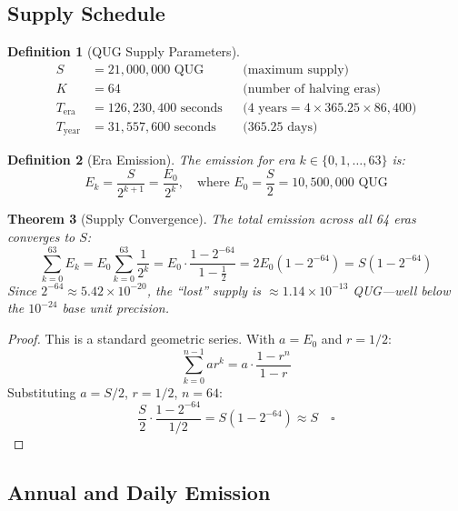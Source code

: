 \documentclass[11pt,a4paper]{article}
\newtheorem{theorem}{Theorem}[section]
\newtheorem{definition}[theorem]{Definition}
\begin{document}
\subsection{Supply Schedule}

\begin{definition}[QUG Supply Parameters]
\label{def:params}
\begin{align}
    S &= 21{,}000{,}000 \text{ QUG} && \text{(maximum supply)} \\
    K &= 64 && \text{(number of halving eras)} \\
    T_{\text{era}} &= 126{,}230{,}400 \text{ seconds} && \text{(4 years} = 4 \times 365.25 \times 86{,}400\text{)} \\
    T_{\text{year}} &= 31{,}557{,}600 \text{ seconds} && \text{(365.25 days)}
\end{align}
\end{definition}

\begin{definition}[Era Emission]
The emission for era $k \in \{0, 1, \ldots, 63\}$ is:
\begin{equation}
    E_k = \frac{S}{2^{k+1}} = \frac{E_0}{2^k}, \quad \text{where } E_0 = \frac{S}{2} = 10{,}500{,}000 \text{ QUG}
\end{equation}
\end{definition}

\begin{theorem}[Supply Convergence]
\label{thm:supply}
The total emission across all 64 eras converges to $S$:
\begin{equation}
    \sum_{k=0}^{63} E_k = E_0 \sum_{k=0}^{63} \frac{1}{2^k} = E_0 \cdot \frac{1 - 2^{-64}}{1 - \frac{1}{2}} = 2E_0 \left(1 - 2^{-64}\right) = S\left(1 - 2^{-64}\right)
\end{equation}
Since $2^{-64} \approx 5.42 \times 10^{-20}$, the ``lost'' supply is $\approx 1.14 \times 10^{-13}$ QUG---well below the $10^{-24}$ base unit precision.
\end{theorem}

\begin{proof}
This is a standard geometric series. With $a = E_0$ and $r = 1/2$:
\[
\sum_{k=0}^{n-1} ar^k = a \cdot \frac{1-r^n}{1-r}
\]
Substituting $a = S/2$, $r = 1/2$, $n = 64$:
\[
\frac{S}{2} \cdot \frac{1 - 2^{-64}}{1/2} = S(1 - 2^{-64}) \approx S \quad \square
\]
\end{proof}

\subsection{Annual and Daily Emission}
\end{document}
